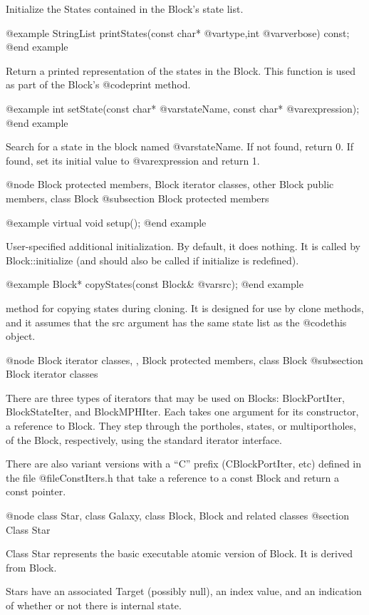 Initialize the States contained in the Block's state list.

@example
StringList printStates(const char* @var{type},int @var{verbose}) const;
@end example

Return a printed representation of the states in the Block.  This
function is used as part of the Block's @code{print} method.

@example
int setState(const char* @var{stateName}, const char* @var{expression});
@end example

Search for a state in the block named @var{stateName}.  If not found,
return 0.  If found, set its initial value to @var{expression} and
return 1.

@node Block protected members, Block iterator classes, other Block public members, class Block
@subsection Block protected members

@example
virtual void setup();
@end example

User-specified additional initialization.  By default, it does nothing.
It is called by Block::initialize (and should also be called if
initialize is redefined).

@example
Block* copyStates(const Block& @var{src});
@end example

method for copying states during cloning.  It is designed for use
by clone methods, and it assumes that the src argument has the same
state list as the @code{this} object.

@node Block iterator classes,  , Block protected members, class Block
@subsection Block iterator classes

There are three types of iterators that may be used on Blocks:
BlockPortIter, BlockStateIter, and BlockMPHIter.
Each takes one argument for its constructor, a reference to Block.
They step through the portholes, states, or multiportholes, of the
Block, respectively, using the standard iterator interface.

There are also variant versions with a ``C'' prefix (CBlockPortIter, etc)
defined in the file @file{ConstIters.h} that take a reference to a const Block
and return a const pointer.

@node class Star, class Galaxy, class Block, Block and related classes
@section Class Star

Class Star represents the basic executable atomic version of Block.
It is derived from Block.

Stars have an associated Target (possibly null), an index value,
and an indication of whether or not there is internal state.

